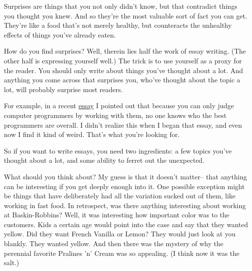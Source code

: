 Surprises are
                  things that you not only didn't know, but that contradict
                  things you thought you knew. And so they're the most valuable
                  sort of fact you can get. They're like a food that's not
                  merely healthy, but counteracts the unhealthy effects of
                  things you've already eaten.

How do you find
                  surprises? Well, therein lies half the work of essay writing.
                  (The other half is expressing yourself well.) The trick is to
                  use yourself as a proxy for the reader. You should only write
                  about things you've thought about a lot. And anything you come
                  across that surprises you, who've thought about the topic a
                  lot, will probably surprise most readers.

For
                  example, in a recent \href{http://www.paulgraham.com/gh.html}{essay} I pointed out
                  that because you can only judge computer programmers by
                  working with them, no one knows who the best programmers are
                  overall. I didn't realize this when I began that essay, and
                  even now I find it kind of weird. That's what you're looking
                  for.

So if you want to write essays, you need two
                  ingredients: a few topics you've thought about a lot, and some
                  ability to ferret out the unexpected.

What should
                  you think about? My guess is that it doesn't matter-- that
                  anything can be interesting if you get deeply enough into it.
                  One possible exception might be things that have deliberately
                  had all the variation sucked out of them, like working in fast
                  food. In retrospect, was there anything interesting about
                  working at Baskin-Robbins? Well, it was interesting how
                  important color was to the customers. Kids a certain age would
                  point into the case and say that they wanted yellow. Did they
                  want French Vanilla or Lemon? They would just look at you
                  blankly. They wanted yellow. And then there was the mystery of
                  why the perennial favorite Pralines 'n' Cream was so
                  appealing. (I think now it was the salt.)
                  
